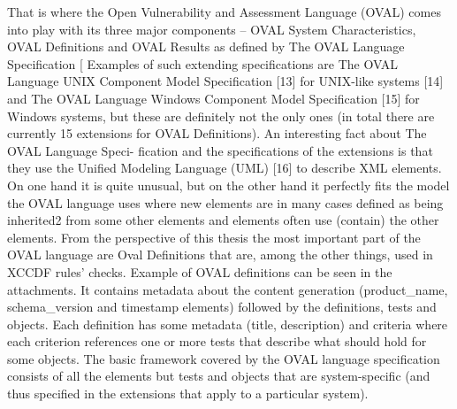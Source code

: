 \documentclass[../main.tex]{subfiles}
\begin{document}
That is where the Open Vulnerability and Assessment Language (OVAL) comes into play with its three major
components – OVAL System Characteristics, OVAL Definitions and
OVAL Results as defined by The OVAL Language Specification [
Examples of such extending specifications are The OVAL
Language UNIX Component Model Specification [13] for UNIX-like
systems [14] and The OVAL Language Windows Component Model
Specification [15] for Windows systems, but these are definitely not
the only ones (in total there are currently 15 extensions for OVAL
Definitions). An interesting fact about The OVAL Language Speci-
fication and the specifications of the extensions is that they use the
Unified Modeling Language (UML) [16] to describe XML elements.
On one hand it is quite unusual, but on the other hand it perfectly
fits the model the OVAL language uses where new elements are in
many cases defined as being inherited2
from some other elements
and elements often use (contain) the other elements.
From the perspective of this thesis the most important part of
the OVAL language are Oval Definitions that are, among the other
things, used in XCCDF rules’ checks. Example of OVAL definitions
can be seen in the attachments. It contains metadata about the content
generation (product\_name, schema\_version and timestamp
elements) followed by the definitions, tests and objects. Each
definition has some metadata (title, description) and criteria
where each criterion references one or more tests that describe
what should hold for some objects. The basic framework covered
by the OVAL language specification consists of all the elements but
tests and objects that are system-specific (and thus specified in
the extensions that apply to a particular system).
\end{document}
